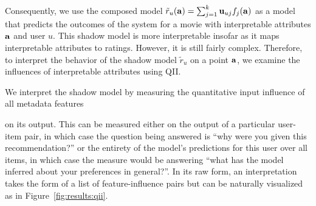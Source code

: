 Consequently, we use the composed model $\tilde{r}_u(\mathbf{a}) = \sum_{j = 1}^k
\mathbf{u}_{uj}f_j(\mathbf{a})$ as a model that predicts the outcomes of the system
for a movie with interpretable attributes $\mathbf{a}$ and user $u$. This shadow model
is more interpretable insofar as it maps interpretable attributes to
ratings. However, it is still fairly complex. Therefore, to interpret the
behavior of the shadow model $\tilde{r}_u$ on a point $\mathbf{a}$, we examine
the influences of interpretable attributes using QII.

We interpret the shadow model by measuring the quantitative input
influence of all metadata features

on its output.
This can be measured either on the output of a particular user-item
pair, in which case the question being answered is ``why were you
given this recommendation?''
or the entirety of the model's predictions for this user over all
items, in which case the measure would be answering ``what has the
model inferred about your preferences in general?''.
In its raw form, an interpretation takes the form of a list of
feature-influence pairs but can be naturally visualized as in
Figure~\ref{fig:results:qii}.

